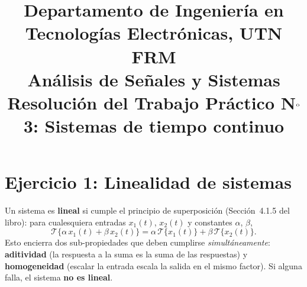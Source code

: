 \documentclass[10pt,a4paper]{article}
\title{%
	{\normalsize Departamento de Ingeniería en Tecnologías Electrónicas, UTN FRM}\\[0.1cm]
	{\large Análisis de Señales y Sistemas}\\[0.15cm]
	{\normalsize Resolución del Trabajo Práctico N$^{\text o}$3: Sistemas de tiempo continuo}%
}
\author{}
\date{}
\begin{document}
	\maketitle
	\thispagestyle{fancy}
	
	\label{sec:resolucion}

	\section*{Ejercicio 1: Linealidad de sistemas}
	
	Un sistema es \textbf{lineal} si cumple el principio de superposición (Sección~4.1.5 del libro): para cualesquiera entradas $x_1(t)$, $x_2(t)$ y constantes $\alpha$, $\beta$,
	\[
	\mathcal{T}\{\alpha\,x_1(t) + \beta\,x_2(t)\} = \alpha\,\mathcal{T}\{x_1(t)\} + \beta\,\mathcal{T}\{x_2(t)\}.
	\]
	Esto encierra dos sub-propiedades que deben cumplirse \textit{simultáneamente}: \textbf{aditividad} (la respuesta a la suma es la suma de las respuestas) y \textbf{homogeneidad} (escalar la entrada escala la salida en el mismo factor). Si alguna falla, el sistema \textbf{no es lineal}.
	
\end{document}

